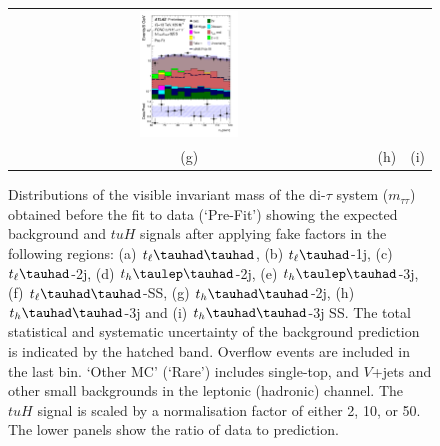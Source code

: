 \begin{figure}[H]
\begin{tabular}{@{}ccc@{}}
\includegraphics[page=1,width=0.28\textwidth]{figures/mtt/tuH_reg2mtau1b3jss_log_mtt.pdf}\\
(g) & (h) & (i)\\
\end{tabular}
\caption{Distributions of the visible invariant mass of the di-$\tau$ system ($m_{\tau\tau}$) obtained before the fit to data (`Pre-Fit') showing 
  the expected background and $tuH$ signals after applying fake factors in the following regions: (a) $t_{\ell}\thadhad$,
 (b) $t_{\ell}\tauhad$-1j,  (c) $t_{\ell}\tauhad$-2j, (d) $t_h\tlhad$-2j, (e) $t_h\tlhad$-3j, (f) $t_{\ell}\thadhad$-SS, (g) $t_h\thadhad$-2j, (h) $t_h\thadhad$-3j and (i) $t_h\thadhad$-3j SS.
 The total statistical and systematic uncertainty of the background prediction is indicated by the hatched band.
 Overflow events are included in the last bin. `Other MC' (`Rare') includes single-top, and $V$+jets and other small backgrounds in the leptonic (hadronic) channel. The $tuH$ signal is scaled by a normalisation factor of either 2, 10, or 50.   
The lower panels show the ratio of data to prediction.}
\label{fig:mtt}
\end{figure}


